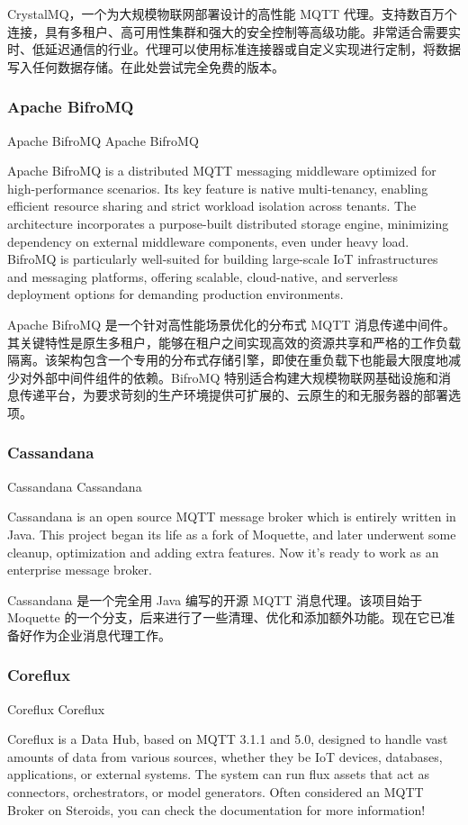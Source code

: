 \documentclass{ctexbook}
\begin{document}
CrystalMQ，一个为大规模物联网部署设计的高性能 MQTT 代理。支持数百万个连接，具有多租户、高可用性集群和强大的安全控制等高级功能。非常适合需要实时、低延迟通信的行业。代理可以使用标准连接器或自定义实现进行定制，将数据写入任何数据存储。在此处尝试完全免费的版本。

\subsubsection{Apache BifroMQ}
Apache BifroMQ Apache BifroMQ

Apache BifroMQ is a distributed MQTT messaging middleware optimized for high-performance scenarios. Its key feature is native multi-tenancy, enabling efficient resource sharing and strict workload isolation across tenants. The architecture incorporates a purpose-built distributed storage engine, minimizing dependency on external middleware components, even under heavy load. BifroMQ is particularly well-suited for building large-scale IoT infrastructures and messaging platforms, offering scalable, cloud-native, and serverless deployment options for demanding production environments.

Apache BifroMQ 是一个针对高性能场景优化的分布式 MQTT 消息传递中间件。其关键特性是原生多租户，能够在租户之间实现高效的资源共享和严格的工作负载隔离。该架构包含一个专用的分布式存储引擎，即使在重负载下也能最大限度地减少对外部中间件组件的依赖。BifroMQ 特别适合构建大规模物联网基础设施和消息传递平台，为要求苛刻的生产环境提供可扩展的、云原生的和无服务器的部署选项。

\subsubsection{Cassandana}
Cassandana Cassandana

Cassandana is an open source MQTT message broker which is entirely written in Java. This project began its life as a fork of Moquette, and later underwent some cleanup, optimization and adding extra features. Now it's ready to work as an enterprise message broker.

Cassandana 是一个完全用 Java 编写的开源 MQTT 消息代理。该项目始于 Moquette 的一个分支，后来进行了一些清理、优化和添加额外功能。现在它已准备好作为企业消息代理工作。

\subsubsection{Coreflux}
Coreflux Coreflux

Coreflux is a Data Hub, based on MQTT 3.1.1 and 5.0, designed to handle vast amounts of data from various sources, whether they be IoT devices, databases, applications, or external systems. The system can run flux assets that act as connectors, orchestrators, or model generators. Often considered an MQTT Broker on Steroids, you can check the documentation for more information!
\end{document}
